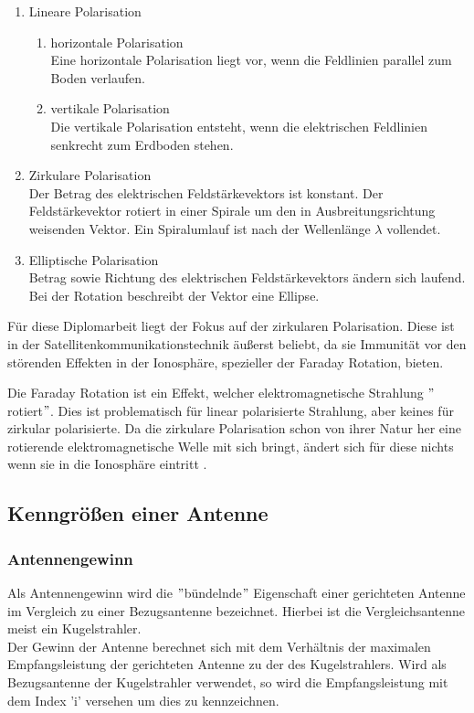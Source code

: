 \begin{enumerate}
	\item Lineare Polarisation
	\begin{enumerate}
		\item horizontale Polarisation\\
		Eine horizontale Polarisation liegt vor, wenn die Feldlinien parallel zum Boden verlaufen.
		\item vertikale Polarisation\\
		Die vertikale Polarisation entsteht, wenn die elektrischen Feldlinien senkrecht zum Erdboden stehen.
	\end{enumerate}
	\item Zirkulare Polarisation\\
	Der Betrag des elektrischen Feldstärkevektors ist konstant. Der Feldstärkevektor rotiert in einer Spirale um den in Ausbreitungsrichtung weisenden Vektor. Ein Spiralumlauf ist nach der Wellenlänge $\lambda$ vollendet.
	\item Elliptische Polarisation\\
	Betrag sowie Richtung des elektrischen Feldstärkevektors ändern sich laufend. Bei der Rotation beschreibt der Vektor eine Ellipse.
\end{enumerate}

Für diese Diplomarbeit liegt der Fokus auf der zirkularen Polarisation. Diese ist in der Satellitenkommunikationstechnik äußerst beliebt, da sie Immunität vor den störenden Effekten in der Ionosphäre, spezieller der Faraday Rotation, bieten.

Die Faraday Rotation ist ein Effekt, welcher elektromagnetische Strahlung $"$rotiert$"$. Dies ist problematisch für linear polarisierte Strahlung, aber keines für zirkular polarisierte. Da die zirkulare Polarisation schon von ihrer Natur her eine rotierende elektromagnetische Welle mit sich bringt, ändert sich für diese nichts wenn sie in die Ionosphäre eintritt \cite{takashi_encyclopedia_2003}.

\subsection{Kenngrößen einer Antenne}

\subsubsection{Antennengewinn}
Als Antennengewinn wird die $"$bündelnde$"$ Eigenschaft einer gerichteten Antenne im Vergleich zu einer Bezugsantenne bezeichnet. Hierbei ist die Vergleichsantenne meist ein Kugelstrahler.\\
\newline
Der Gewinn der Antenne berechnet sich mit dem Verhältnis der maximalen Empfangsleistung der gerichteten Antenne zu der des Kugelstrahlers. Wird als Bezugsantenne der Kugelstrahler verwendet, so wird die Empfangsleistung mit dem Index 'i' versehen um dies zu kennzeichnen.

